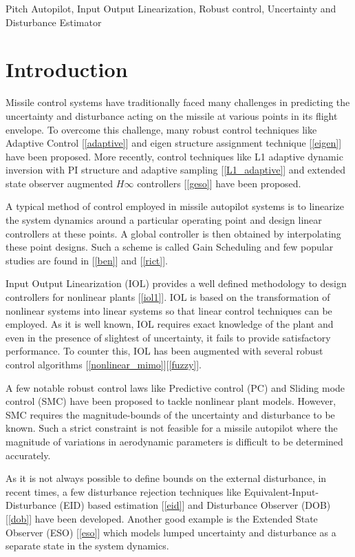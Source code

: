 \documentclass[conference]{IEEEtran}
\begin{document}
\begin{IEEEkeywords}
	Pitch Autopilot, Input Output Linearization, Robust control, Uncertainty and Disturbance Estimator
\end{IEEEkeywords}

\section{Introduction}
	
	Missile control systems have traditionally faced many challenges in predicting the uncertainty and disturbance acting on the missile at various points in its flight envelope. To overcome this challenge, many robust control techniques like Adaptive Control [\ref{adaptive}] and eigen structure assignment technique [\ref{eigen}] have been proposed. More recently, control techniques like L1 adaptive dynamic inversion with PI structure and adaptive sampling [\ref{L1_adaptive}] and extended state observer augmented $H\infty$ controllers [\ref{geso}] have been proposed. 
	
	A typical method of control employed in missile autopilot systems is to linearize the system dynamics around a particular operating point and design linear controllers at these points. A global controller is then obtained by interpolating these point designs. Such a scheme is called Gain Scheduling and few popular studies are found in [\ref{ben}] and [\ref{rict}]. 
	
	Input Output Linearization (IOL) provides a well defined methodology to design controllers for nonlinear plants [\ref{iol1}]. IOL is based on the transformation of nonlinear systems into linear systems so that linear control techniques can be employed. As it is well known, IOL requires exact knowledge of the plant and even in the presence of slightest of uncertainty, it fails to provide satisfactory performance. To counter this, IOL has been augmented with several robust control algorithms [\ref{nonlinear_mimo}][\ref{fuzzy}].
	
	A few notable robust control laws like Predictive control (PC) and Sliding mode control (SMC) have been proposed to tackle nonlinear plant models. However, SMC requires the magnitude-bounds of the uncertainty and disturbance to be known. Such a strict constraint is not feasible  for a missile autopilot where the magnitude of variations in aerodynamic parameters is difficult to be determined accurately.  
	
	As it is not always possible to define bounds on the external disturbance, in recent times, a few disturbance rejection techniques like Equivalent-Input-Disturbance (EID) based estimation [\ref{eid}] and Disturbance Observer (DOB) [\ref{dob}] have been developed. Another good example is the Extended State Observer (ESO) [\ref{eso}] which models lumped uncertainty and disturbance as a separate state in the system dynamics. 
	
\end{document}
